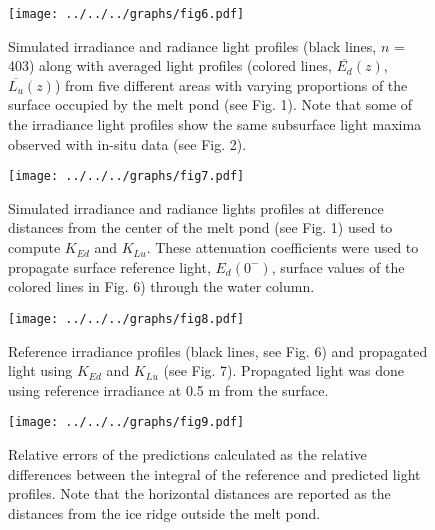 \documentclass[12pt,a4paper]{scrartcl}
\newcommand{\ked}{\ensuremath{K_{Ed}}}
\newcommand{\klu}{\ensuremath{K_{Lu}}}
\newcommand{\edzero}{\ensuremath{{E_d(0^-)}}}
\newcommand{\meanedz}{\ensuremath{{\overline{E_d}(z)}}}
\newcommand{\meanluz}{\ensuremath{{\overline{L_u}(z)}}}
\begin{document}
\clearpage
\newpage

\begin{figure}[ht]
	\centering
	\texttt{[image: ../../../graphs/fig6.pdf]}
	\caption{Simulated irradiance and radiance light profiles (black lines, $n$ = 403) along with averaged light profiles (colored lines, \meanedz{}, \meanluz{}) from five different areas with varying proportions of the surface occupied by the melt pond (see Fig. 1). Note that some of the irradiance light profiles show the same subsurface light maxima observed with in-situ data (see Fig. 2).}
\end{figure}

\clearpage
\newpage

\begin{figure}[ht]
	\centering
	\texttt{[image: ../../../graphs/fig7.pdf]}
	\caption{Simulated irradiance and radiance lights profiles at difference distances from the center of the melt pond (see Fig. 1) used to compute \ked{} and \klu{}. These attenuation coefficients were used to propagate surface reference light, \edzero{}, surface values of the colored lines in Fig. 6) through the water column.}
\end{figure}

\clearpage
\newpage

\begin{figure}[ht]
	\centering
	\texttt{[image: ../../../graphs/fig8.pdf]}
	\caption{Reference irradiance profiles (black lines, see Fig. 6) and propagated light using \ked{} and \klu{} (see Fig. 7). Propagated light was done using reference irradiance at 0.5 m from the surface.}
\end{figure}

\clearpage
\newpage

\begin{figure}[ht]
	\centering
	\texttt{[image: ../../../graphs/fig9.pdf]}
	\caption{Relative errors of the predictions calculated as the relative differences between the integral of the reference and predicted light profiles. Note that the horizontal distances are reported as the distances from the ice ridge outside the melt pond.}
\end{figure}
\end{document}
